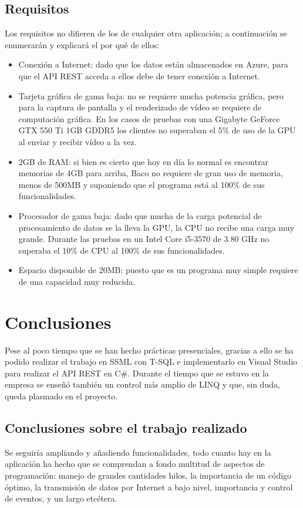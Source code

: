 \documentclass[12pt, a4paper]{book} %
\begin{document}
		\section{Requisitos}
		Los requisitos no difieren de los de cualquier otra aplicación; a continuación se enumerarán y explicará el por qué de ellos:
		\begin{itemize}
			\item Conexión a Internet: dado que los datos están almacenados en Azure, para que el API REST acceda a ellos debe de tener conexión a Internet.
			\item Tarjeta gráfica de gama baja: no se requiere mucha potencia gráfica, pero para la captura de pantalla y el renderizado de vídeo se requiere de computación gráfica. En los casos de pruebas con una Gigabyte GeForce GTX 550 Ti 1GB GDDR5 los clientes no superaban el 5\% de uso de la GPU al enviar y recibir vídeo a la vez.
			\item 2GB de RAM: si bien es cierto que hoy en día lo normal es encontrar memorias de 4GB para arriba, Baco no requiere de gran uso de memoria, menos de 500MB y suponiendo que el programa está al 100\% de sus funcionalidades.
			\item Procesador de gama baja: dado que mucha de la carga potencial de procesamiento de datos se la lleva la GPU, la CPU no recibe una carga muy grande. Durante las pruebas en un Intel Core i5-3570 de 3.80 GHz no superaba el 10\% de CPU al 100\% de sus funcionalidades.
			\item Espacio disponible de 20MB: puesto que es un programa muy simple requiere de una capacidad muy reducida.
		\end{itemize}
	
	\chapter{Conclusiones}
	Pese al poco tiempo que se han hecho prácticas presenciales, gracias a ello se ha podido realizar el trabajo en SSML con T-SQL e implementarlo en Visual Studio para realizar el API REST en C\#. Durante el tiempo que se estuvo en la empresa se enseñó también un control más amplío de LINQ y que, sin duda, queda plasmado en el proyecto.
		\section{Conclusiones sobre el trabajo realizado}
		Se seguiría ampliando y añadiendo funcionalidades, todo cuanto hay en la aplicación ha hecho que se comprendan a fondo multitud de aspectos de programación: manejo de grandes cantidades hilos, la importancia de un código óptimo, la transmisión de datos por Internet a bajo nivel, importancia y control de eventos, y un largo etcétera.
\end{document}
